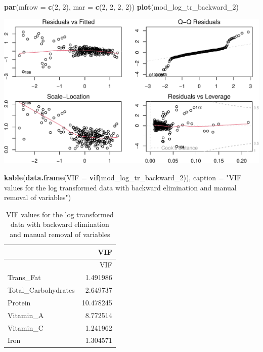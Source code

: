 \documentclass[
]{article}
\newenvironment{Shaded}{\begin{snugshade}}{\end{snugshade}}
\newcommand{\AttributeTok}[1]{\textcolor[rgb]{0.13,0.29,0.53}{#1}}
\newcommand{\DecValTok}[1]{\textcolor[rgb]{0.00,0.00,0.81}{#1}}
\newcommand{\FunctionTok}[1]{\textcolor[rgb]{0.13,0.29,0.53}{\textbf{#1}}}
\newcommand{\NormalTok}[1]{#1}
\newcommand{\StringTok}[1]{\textcolor[rgb]{0.31,0.60,0.02}{#1}}
\begin{document}
\begin{Shaded}
\begin{Highlighting}[]
\FunctionTok{par}\NormalTok{(}\AttributeTok{mfrow =} \FunctionTok{c}\NormalTok{(}\DecValTok{2}\NormalTok{, }\DecValTok{2}\NormalTok{), }\AttributeTok{mar =} \FunctionTok{c}\NormalTok{(}\DecValTok{2}\NormalTok{, }\DecValTok{2}\NormalTok{, }\DecValTok{2}\NormalTok{, }\DecValTok{2}\NormalTok{))}
\FunctionTok{plot}\NormalTok{(mod\_log\_tr\_backward\_2)}
\end{Highlighting}
\end{Shaded}

\begin{center}\includegraphics{Statistical_Learning_Final_Report_files/figure-latex/backward_elimination_log_2-1} \end{center}

\begin{Shaded}
\begin{Highlighting}[]
\FunctionTok{kable}\NormalTok{(}\FunctionTok{data.frame}\NormalTok{(}\AttributeTok{VIF =} \FunctionTok{vif}\NormalTok{(mod\_log\_tr\_backward\_2)),}
      \AttributeTok{caption =} \StringTok{"VIF values for the log transformed data with backward }
\StringTok{      elimination and manual removal of variables"}\NormalTok{)}
\end{Highlighting}
\end{Shaded}

\begin{longtable}[]{@{}lr@{}}
\caption{VIF values for the log transformed data with backward
elimination and manual removal of variables}\tabularnewline
\toprule\noalign{}
& VIF \\
\midrule\noalign{}
\endfirsthead
\toprule\noalign{}
& VIF \\
\midrule\noalign{}
\endhead
\bottomrule\noalign{}
\endlastfoot
Trans\_Fat & 1.491986 \\
Total\_Carbohydrates & 2.649737 \\
Protein & 10.478245 \\
Vitamin\_A & 8.772514 \\
Vitamin\_C & 1.241962 \\
Iron & 1.304571 \\
\end{longtable}
\end{document}
